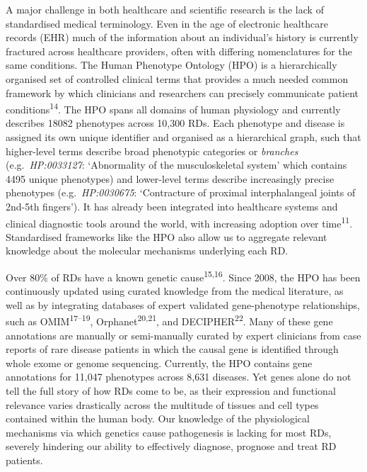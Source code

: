 \documentclass[
]{article}
\begin{document}
A major challenge in both healthcare and scientific research is the lack
of standardised medical terminology. Even in the age of electronic
healthcare records (EHR) much of the information about an individual's
history is currently fractured across healthcare providers, often with
differing nomenclatures for the same conditions. The Human Phenotype
Ontology (HPO) is a hierarchically organised set of controlled clinical
terms that provides a much needed common framework by which clinicians
and researchers can precisely communicate patient
conditions\textsuperscript{14}. The HPO spans all domains of human
physiology and currently describes 18082 phenotypes across 10,300 RDs.
Each phenotype and disease is assigned its own unique identifier and
organised as a hierarchical graph, such that higher-level terms describe
broad phenotypic categories or \emph{branches} (e.g.~\emph{HP:0033127}:
`Abnormality of the musculoskeletal system' which contains 4495 unique
phenotypes) and lower-level terms describe increasingly precise
phenotypes (e.g.~\emph{HP:0030675}: `Contracture of proximal
interphalangeal joints of 2nd-5th fingers'). It has already been
integrated into healthcare systems and clinical diagnostic tools around
the world, with increasing adoption over time\textsuperscript{11}.
Standardised frameworks like the HPO also allow us to aggregate relevant
knowledge about the molecular mechanisms underlying each RD.

Over 80\% of RDs have a known genetic cause\textsuperscript{15,16}.
Since 2008, the HPO has been continuously updated using curated
knowledge from the medical literature, as well as by integrating
databases of expert validated gene-phenotype relationships, such as
OMIM\textsuperscript{17--19}, Orphanet\textsuperscript{20,21}, and
DECIPHER\textsuperscript{22}. Many of these gene annotations are
manually or semi-manually curated by expert clinicians from case reports
of rare disease patients in which the causal gene is identified through
whole exome or genome sequencing. Currently, the HPO contains gene
annotations for 11,047 phenotypes across 8,631 diseases. Yet genes alone
do not tell the full story of how RDs come to be, as their expression
and functional relevance varies drastically across the multitude of
tissues and cell types contained within the human body. Our knowledge of
the physiological mechanisms via which genetics cause pathogenesis is
lacking for most RDs, severely hindering our ability to effectively
diagnose, prognose and treat RD patients.
\end{document}
